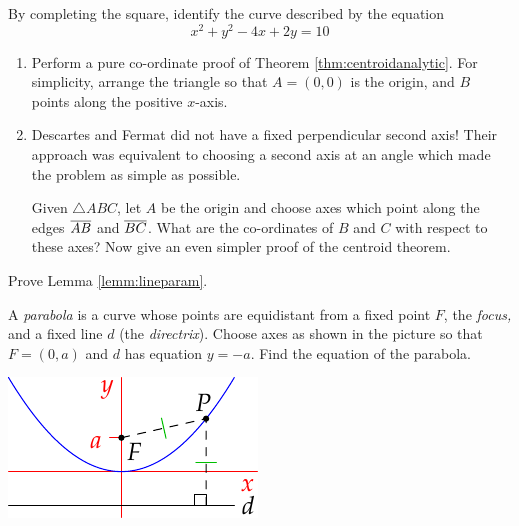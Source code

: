 \begin{exercises}
\exstart By completing the square, identify the curve described by the equation
	\[x^2+y^2-4x+2y=10\]

\begin{enumerate}\setcounter{enumi}{1}
  \item\begin{enumerate}
  	\item Perform a pure co-ordinate proof of Theorem \ref{thm:centroidanalytic}. For simplicity, arrange the triangle so that $A=(0,0)$ is the origin, and $B$ points along the positive $x$-axis.
  
		\item Descartes and Fermat did not have a fixed perpendicular second axis! Their approach was equivalent to choosing a second axis at an angle which made the problem as simple as possible.\par
		Given $\triangle ABC$, let $A$ be the origin and choose axes which point along the edges $\overline{AB}$ and $\overline{BC}$. What are the co-ordinates of $B$ and $C$ with respect to these axes? Now give an even simpler proof of the centroid theorem.
  \end{enumerate}

	
	\item Prove Lemma \ref{lemm:lineparam}.
	
	
	\begin{minipage}[t]{0.7\linewidth}\vspace{-2pt}
	\item A \emph{parabola} is a curve whose points are equidistant from a fixed point $F$, the \emph{focus,} and a fixed line $d$ (the \emph{directrix}). Choose axes as shown in the picture so that $F=(0,a)$ and $d$ has equation $y=-a$. Find the equation of the parabola.
	\end{minipage}\hfill\begin{minipage}[t]{0.29\linewidth}\vspace{-2pt}
	\flushright\includegraphics{analytic-parabola}
	\end{minipage}
	
\end{enumerate}
\end{exercises}


